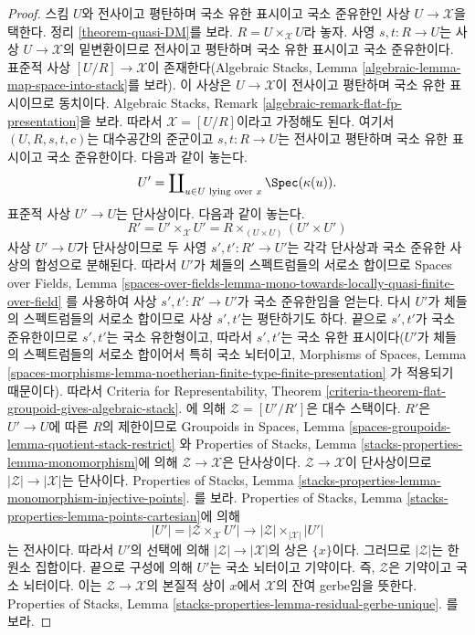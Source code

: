\begin{proof}
스킴 $U$와 전사이고 평탄하며 국소 유한 표시이고 국소 준유한인 사상
$U \to \mathcal{X}$을 택한다.%
정리 \ref{theorem-quasi-DM}를 보라. $R = U \times_\mathcal{X} U$라
놓자. 사영 $s, t : R \to U$는 사상 $U \to \mathcal{X}$의 밑변환이므로
전사이고 평탄하며 국소 유한 표시이고 국소 준유한이다. 표준적 사상
$[U/R] \to \mathcal{X}$이 존재한다(Algebraic Stacks, Lemma
\ref{algebraic-lemma-map-space-into-stack}를 보라). 이 사상은
$U \to \mathcal{X}$이 전사이고 평탄하며 국소 유한 표시이므로 동치이다.
Algebraic Stacks, Remark \ref{algebraic-remark-flat-fp-presentation}을 보라.
따라서 $\mathcal{X} = [U/R]$이라고 가정해도 된다. 여기서
$(U, R, s, t, c)$는 대수공간의 준군이고 $s, t : R \to U$는 전사이고
평탄하며 국소 유한 표시이고 국소 준유한이다. 다음과 같이 놓는다.
$$
U' = \coprod\nolimits_{u \in U\text{ lying over }x} \Spec(\kappa(u)).
$$
표준적 사상 $U' \to U$는 단사상이다. 다음과 같이 놓는다.
$$
R' = U' \times_\mathcal{X} U' =
R \times_{(U \times U)} (U' \times U')
$$
사상 $U' \to U$가 단사상이므로 두 사영 $s', t' : R' \to U'$는 각각
단사상과 국소 준유한 사상의 합성으로 분해된다. 따라서 $U'$가 체들의
스펙트럼들의 서로소 합이므로 Spaces over Fields, Lemma
\ref{spaces-over-fields-lemma-mono-towards-locally-quasi-finite-over-field}
를 사용하여 사상 $s', t' : R' \to U'$가 국소 준유한임을 얻는다.
다시 $U'$가 체들의 스펙트럼들의 서로소 합이므로 사상 $s', t'$는
평탄하기도 하다. 끝으로 $s', t'$가 국소 준유한이므로 $s', t'$는 국소
유한형이고, 따라서 $s', t'$는 국소 유한 표시이다($U'$가 체들의 스펙트럼들의 서로소
합이어서 특히 국소 뇌터이고, Morphisms of Spaces, Lemma
\ref{spaces-morphisms-lemma-noetherian-finite-type-finite-presentation}
가 적용되기 때문이다). 따라서 Criteria for Representability, Theorem
\ref{criteria-theorem-flat-groupoid-gives-algebraic-stack}.
에 의해 $\mathcal{Z} = [U'/R']$은 대수 스택이다. $R'$은
$U' \to U$에 따른 $R$의 제한이므로 Groupoids in Spaces, Lemma
\ref{spaces-groupoids-lemma-quotient-stack-restrict}
와 Properties of Stacks, Lemma
\ref{stacks-properties-lemma-monomorphism}에 의해
$\mathcal{Z} \to \mathcal{X}$은 단사상이다.
$\mathcal{Z} \to \mathcal{X}$이 단사상이므로
$|\mathcal{Z}| \to |\mathcal{X}|$는 단사이다. Properties of Stacks,
Lemma
\ref{stacks-properties-lemma-monomorphism-injective-points}.
를 보라. Properties of Stacks, Lemma
\ref{stacks-properties-lemma-points-cartesian}에 의해
$$
|U'| = |\mathcal{Z} \times_\mathcal{X} U'|
\longrightarrow
|\mathcal{Z}| \times_{|\mathcal{X}|} |U'|
$$
는 전사이다. 따라서 $U'$의 선택에 의해
$|\mathcal{Z}| \to |\mathcal{X}|$의 상은 $\{x\}$이다. 그러므로
$|\mathcal{Z}|$는 한원소 집합이다. 끝으로 구성에 의해 $U'$는 국소
뇌터이고 기약이다. 즉, $\mathcal{Z}$은 기약이고 국소 뇌터이다. 이는
$\mathcal{Z} \to \mathcal{X}$의 본질적 상이 $x$에서 $\mathcal{X}$의
잔여 gerbe임을 뜻한다. Properties of Stacks, Lemma
\ref{stacks-properties-lemma-residual-gerbe-unique}.
를 보라.
\end{proof}

